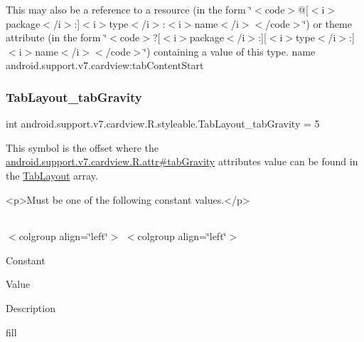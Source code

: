 This may also be a reference to a resource (in the form \char`\"{}$<$code$>$@\mbox{[}$<$i$>$package$<$/i$>$\+:\mbox{]}$<$i$>$type$<$/i$>$\+:$<$i$>$name$<$/i$>$$<$/code$>$\char`\"{}) or theme attribute (in the form \char`\"{}$<$code$>$?\mbox{[}$<$i$>$package$<$/i$>$\+:\mbox{]}\mbox{[}$<$i$>$type$<$/i$>$\+:\mbox{]}$<$i$>$name$<$/i$>$$<$/code$>$\char`\"{}) containing a value of this type.  name android.\+support.\+v7.\+cardview\+:tab\+Content\+Start \mbox{\label{classandroid_1_1support_1_1v7_1_1cardview_1_1R_1_1styleable_a1a68091dcc77c9282baf3784559785fe}} 
\subsubsection{\texorpdfstring{Tab\+Layout\+\_\+tab\+Gravity}{TabLayout\_tabGravity}}
{\footnotesize\ttfamily int android.\+support.\+v7.\+cardview.\+R.\+styleable.\+Tab\+Layout\+\_\+tab\+Gravity = 5\hspace{0.3cm}{\ttfamily [static]}}

This symbol is the offset where the \hyperlink{classandroid_1_1support_1_1v7_1_1cardview_1_1R_1_1attr_a33950a613ff954c84c39d6d194da00b2}{android.\+support.\+v7.\+cardview.\+R.\+attr\#tab\+Gravity} attribute\textquotesingle{}s value can be found in the \hyperlink{classandroid_1_1support_1_1v7_1_1cardview_1_1R_1_1styleable_afa0dc9366603eaec9e38d99273ba8512}{Tab\+Layout} array.

\begin{DoxyVerb}      <p>Must be one of the following constant values.</p>
\end{DoxyVerb}
 \tabulinesep=1mm
\begin{longtabu} spread 0pt [c]{*{0}{|X[-1]}|}
\hline
\end{longtabu}
$<$colgroup align=\char`\"{}left\char`\"{}$>$ $<$colgroup align=\char`\"{}left\char`\"{}$>$ 

Constant

Value

Description 

{\ttfamily fill}

